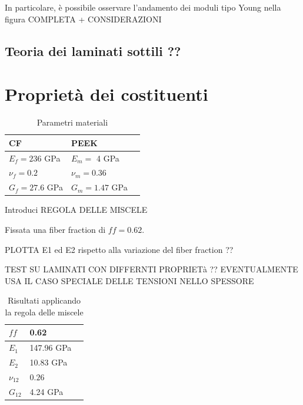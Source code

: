\documentclass[a4paper,num-refs]{oup-contemporary}
\begin{document}
In particolare, è possibile osservare l'andamento dei moduli tipo Young nella figura COMPLETA + CONSIDERAZIONI

\subsection{Teoria dei laminati sottili ??}

\textcolor{blue}{\lipsum[1-2]}




\section{Proprietà dei costituenti}

\begin{table}[bt!]
	\centering
	\captionsetup{justification=centering}
	
	\caption{Parametri materiali \citep{Gallagher}}

	\begin{tabular}{l l l}
		\toprule
		CF & PEEK\\
		\midrule
		$E_{f}=236$ GPa & $E_{m}=$ 4 GPa   \\
		$\nu_{f}= 0.2$ & $\nu_{m}= 0.36$ \\
		$G_f=27.6 $ GPa & $G_m=1.47$ GPa \\
		\bottomrule
	\end{tabular}
	\label{tab:parametri}
\end{table}

Introduci REGOLA DELLE MISCELE

Fissata una fiber fraction di $ff=0.62$.  

PLOTTA E1 ed E2 rispetto alla variazione del fiber fraction ??

TEST SU LAMINATI CON DIFFERNTI PROPRIETà ??  EVENTUALMENTE USA IL CASO SPECIALE DELLE TENSIONI NELLO SPESSORE

\textcolor{blue}{\lipsum[1-2]}

\begin{table}[bt!]
	\centering
	\captionsetup{justification=centering}
	
	\caption{Risultati applicando la regola delle miscele}
	
	\begin{tabular}{l l l}
		\toprule
				$ff$  & 0.62 \\
						\toprule
		$E_{1}$  & 147.96 GPa  \\
		$E_{2}$  & 10.83 GPa  \\
		$\nu_{12}$ & $0.26$ \\
		$G_{12}$ & 4.24 GPa \\
		\bottomrule
	\end{tabular}
	\label{tab:miscele}
\end{table}
\end{document}
